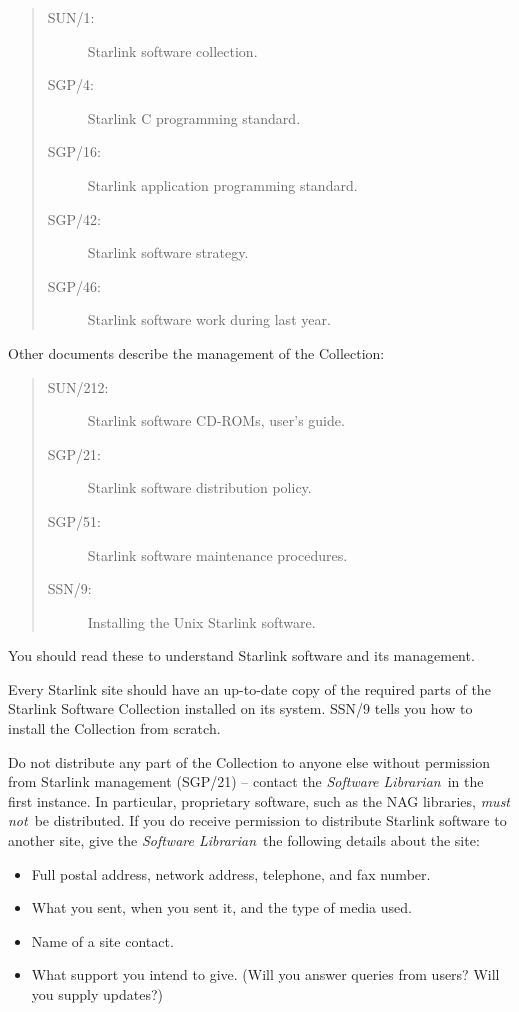 \documentclass[twoside,11pt]{article}
\newcommand{\xref}[3]{#1}
\begin{document}
\begin{quote}
\begin{description}
\item [\xref{SUN/1:}{sun1}{}] Starlink software collection.
\item [\xref{SGP/4:}{sgp4}{}] Starlink C programming standard.
\item [\xref{SGP/16:}{sgp16}{}] Starlink application programming standard.
\item [\xref{SGP/42:}{sgp42}{}] Starlink software strategy.
\item [\xref{SGP/46:}{sgp46}{}] Starlink software work during last year.
\end{description}
\end{quote}

Other documents describe the management of the Collection:

\begin{quote}
\begin{description}
\item [\xref{SUN/212:}{sun212}{}] Starlink software CD-ROMs, user's guide.
\item [\xref{SGP/21:}{sgp21}{}] Starlink software distribution policy.
\item [\xref{SGP/51:}{sgp51}{}] Starlink software maintenance procedures.
\item [\xref{SSN/9:}{ssn9}{}] Installing the Unix Starlink software.
\end{description}
\end{quote}

You should read these to understand Starlink software and its management.

Every Starlink site should have an
up-to-date copy of the required parts of the Starlink Software Collection
installed on its system.
\xref{SSN/9}{ssn9}{}
tells you how to install the Collection from scratch.

Do not distribute any part of the Collection to anyone else without
permission from Starlink management
(\xref{SGP/21}{sgp21}{}) --
contact the {\em Software Librarian}\, in the first instance.
In particular, proprietary software, such as the NAG libraries, {\em must not}\,
be distributed.
If you do receive permission to distribute Starlink software to another site,
give the {\em Software Librarian}\, the following details about the site:

\begin{itemize}
\item Full postal address, network address, telephone, and fax number.
\item What you sent, when you sent it, and the type of media used.
\item Name of a site contact.
\item What support you intend to give.
 (Will you answer queries from users?
 Will you supply updates?)
\end{itemize}
\end{document}
